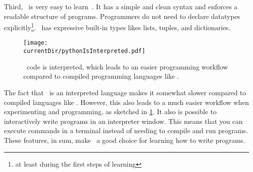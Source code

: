 Third, \python\ is very easy to learn~\cite{GPBS2006WCTIPIHSUP,VR1999CPFERPASEFTPOT}.
It has a simple and clean syntax and enforces a readable structure of programs.
Programmers do not need to declare datatypes explicitly\footnote{at least during the first steps of learning}.
\python\ has expressive built-in types likes lists, tuples, and dictionaries.
%
\begin{figure}%
\centering%
\texttt{[image: \\currentDir/pythonIsInterpreted.pdf]}%
\caption{\python\ code is interpreted, which leads to an easier programming workflow compared to compiled programming languages like .}%
\label{fig:pythonIsInterpreted}%
\end{figure}%
%
The fact that \python\ is an interpreted language makes it somewhat slower compared to compiled languages like .
However, this also leads to a much easier workflow when experimenting and programming, as sketched in \cref{fig:pythonIsInterpreted}.
It also is possible to interactively write programs in an interpreter window.
This means that you can execute commands in a \gls{terminal} instead of needing to compile and run programs.
These features, in sum, make \python\ a good choice for learning how to write programs.%
%
\endhsection%
%
